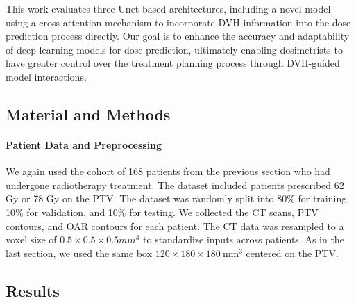 This work evaluates three Unet-based architectures, including a novel model using a cross-attention mechanism to incorporate DVH information into the dose prediction process directly.
Our goal is to enhance the accuracy and adaptability of deep learning models for dose prediction, ultimately enabling dosimetrists to have greater control over the treatment planning process through DVH-guided model interactions.

\subsection{Material and Methods}
\paragraph{Patient Data and Preprocessing}
We again used the cohort of 168 patients from the previous section who had undergone radiotherapy treatment.
The dataset included patients prescribed 62 Gy or 78 Gy on the PTV.
The dataset was randomly split into 80\% for training, 10\% for validation, and 10\% for testing.
We collected the CT scans, PTV contours, and OAR contours for each patient.
The CT data was resampled to a voxel size of $0.5 \times 0.5 \times 0.5 \textit{mm}^3$ to standardize inputs across patients.
As in the last section, we used the same box $120 \times 180 \times 180\ \text{mm}^3$ centered on the PTV.


\subsection{Results}
%
%

